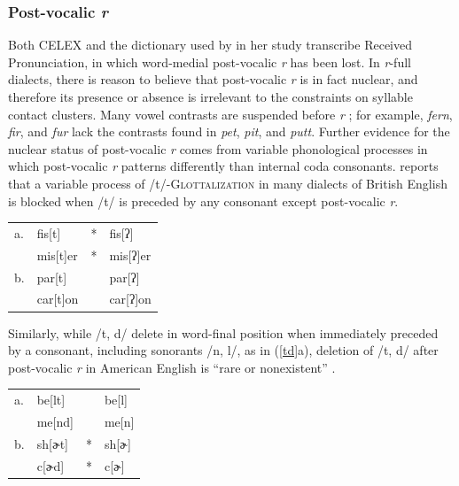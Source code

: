 \subsubsection{Post-vocalic \emph{r}}

Both CELEX and the dictionary used by \citet{Pierrehumbert1994} in her study transcribe Received Pronunciation, in which word-medial post-vocalic \emph{r} has been lost. In \emph{r}-full dialects, there is reason to believe that post-vocalic \emph{r} is in fact nuclear, and therefore its presence or absence is irrelevant to the constraints on syllable contact clusters. Many vowel contrasts are suspended before \emph{r} \citep[][255]{Harris1994}; for example, \emph{fern}, \emph{fir}, and \emph{fur} lack the contrasts found in \emph{pet}, \emph{pit}, and \emph{putt}. Further evidence for the nuclear status of post-vocalic \emph{r} comes from variable phonological processes in which post-vocalic \emph{r} patterns differently than internal coda consonants. \citeauthor{Harris1994} reports that a variable process of /t/-\textsc{Glottalization} in many dialects of British English is blocked when /t/ is preceded by any consonant except post-vocalic \emph{r}.

\begin{example}
\begin{tabular}{l l l@{} l}
a. & fis[t]   & * & fis[ʔ]   \\
   & mis[t]er & * & mis[ʔ]er \\
b. & par[t]   &   & par[ʔ]   \\
   & car[t]on &   & car[ʔ]on \\
\end{tabular}
\end{example}

\noindent Similarly, while /t, d/ delete in word-final position when immediately preceded by a consonant, including sonorants /n, l/, as in (\ref{td}a), deletion of /t, d/ after post-vocalic \emph{r} in American English is ``rare or nonexistent'' \citep[][8]{Guy1980}. 

\begin{example} \label{td}
\begin{tabular}{l l l@{} l}
a. & be[lt]  &   & be[l]  \\
   & me[nd]  &   & me[n]  \\
b. & sh[ɚt]  & * & sh[ɚ] \\
   & c[ɚd]   & * & c[ɚ]  \\
\end{tabular}
\end{example}

